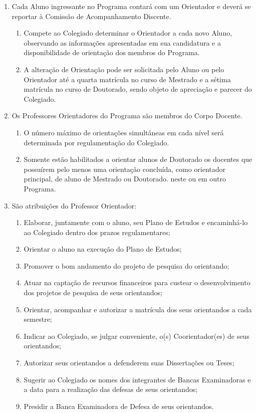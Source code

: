 \documentclass{article}
\newcommand{\grupoMenor}{Colegiado\xspace}
\begin{document}
\begin{enumerate}
	\item Cada Aluno ingressante no Programa contará com um Orientador e deverá se reportar à Comissão de Acompanhamento Discente.
	\begin{enumerate}
		\item Compete ao \grupoMenor determinar o Orientador a cada novo Aluno, observando as informações apresentadas em sua candidatura e a disponibilidade de orientação dos membros do Programa.
		\item A alteração de Orientação pode ser solicitada pelo Aluno ou pelo Orientador até a quarta matrícula no curso de Mestrado e a sétima matrícula no curso de Doutorado, sendo objeto de apreciação e parecer do \grupoMenor.
	\end{enumerate}

	\item Os Professores Orientadores do Programa são membros do Corpo Docente. 
	\begin{enumerate}
		\item O número máximo de orientações simultâneas em cada nível será determinada por regulamentação do \grupoMenor.
		\item Somente estão habilitados a orientar alunos de Doutorado os docentes que possuírem pelo menos uma orientação concluída, como orientador principal, de aluno de Mestrado ou Doutorado. neste ou em outro Programa.
	\end{enumerate}

	\item  São atribuições do Professor Orientador:
	\begin{enumerate}[label=\Roman*]
		\item 	Elaborar, juntamente com o aluno, seu Plano de Estudos e encaminhá-lo ao \grupoMenor dentro dos prazos regulamentares;
		\item	Orientar o aluno na execução do Plano de Estudos;
		\item	Promover o bom andamento do projeto de pesquisa do orientando;
		\item	Atuar na captação de recursos financeiros para custear o desenvolvimento dos projetos de pesquisa de seus orientandos;
		\item	Orientar, acompanhar e autorizar a matrícula dos seus orientandos a cada semestre;
		\item	Indicar ao \grupoMenor, se julgar conveniente, o(s) Coorientador(es) de seus orientandos;
		\item	Autorizar seus orientandos a defenderem suas Dissertações ou Teses;
		\item	Sugerir ao \grupoMenor os nomes dos integrantes de Bancas Examinadoras e a data para a realização das defesas de seus orientandos;
		\item	Presidir a Banca Examinadora de Defesa de seus orientandos.
	\end{enumerate}


\end{enumerate}
\end{document}
